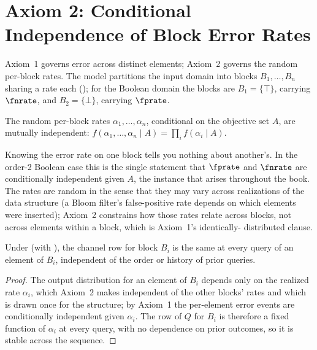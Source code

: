 %

\section[Axiom 2: Conditional Independence of Block Rates]{Axiom 2: Conditional Independence of Block Error Rates}
\label{sec:axiom-2}

Axiom~1 governs error across distinct elements; Axiom~2 governs the random
per-block rates. The model partitions the input domain into blocks $B_1,
\ldots, B_n$ sharing a rate each (); for the Boolean
domain the blocks are $B_1 = \{\top\}$, carrying $\fnrate$, and $B_2 =
\{\bot\}$, carrying $\fprate$.

\begin{axiom}
\label{ax:block-rates-indep}
The random per-block rates $\alpha_1, \ldots, \alpha_n$, conditional on the
objective set $A$, are mutually independent:
$f(\alpha_1, \ldots, \alpha_n \mid A) = \prod_i f(\alpha_i \mid A)$.
\end{axiom}

Knowing the error rate on one block tells you nothing about another's. In the
order-2 Boolean case this is the single statement that $\fprate$ and $\fnrate$
are conditionally independent given $A$, the instance that arises throughout the
book. The rates are random in the sense that they may vary across realizations
of the data structure (a Bloom filter's false-positive rate depends on which
elements were inserted); Axiom~2 constrains how those rates relate across
blocks, not across elements within a block, which is Axiom~1's identically-
distributed clause.

\begin{proposition}
\label{prop:stable-Q}
Under  (with ), the channel
row for block $B_i$ is the same at every query of an element of $B_i$,
independent of the order or history of prior queries.
\end{proposition}

\begin{proof}
The output distribution for an element of $B_i$ depends only on the realized
rate $\alpha_i$, which Axiom~2 makes independent of the other blocks' rates and
which is drawn once for the structure; by Axiom~1 the per-element error events
are conditionally independent given $\alpha_i$. The row of $Q$ for $B_i$ is
therefore a fixed function of $\alpha_i$ at every query, with no dependence on
prior outcomes, so it is stable across the sequence.
\end{proof}

